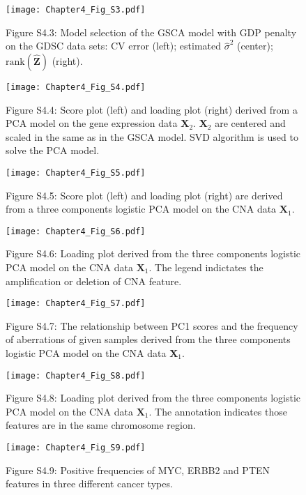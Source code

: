 \begin{figure}[htbp]\label{Fig:S6}
    \centering
    \texttt{[image: Chapter4\_Fig\_S3.pdf]}
    \caption*{Figure S4.3: Model selection of the GSCA model with GDP penalty on the GDSC data sets: CV error (left); estimated $\hat{\sigma}^2$ (center); $\text{rank}(\hat{\mathbf{Z}})$ (right).}
	\label{chapter4_fig:S3}
\end{figure}

\begin{figure}[htbp]
    \centering
    \texttt{[image: Chapter4\_Fig\_S4.pdf]}
    \caption*{Figure S4.4: Score plot (left) and loading plot (right) derived from a PCA model on the gene expression data $\mathbf{X}_2$. $\mathbf{X}_2$ are centered and scaled in the same as in the GSCA model. SVD algorithm is used to solve the PCA model.}
	\label{chapter4_fig:S4}
\end{figure}

\begin{figure}[htbp]
    \centering
    \texttt{[image: Chapter4\_Fig\_S5.pdf]}
    \caption*{Figure S4.5: Score plot (left) and loading plot (right) are derived from a three components logistic PCA model on the CNA data $\mathbf{X}_1$.}
	\label{chapter4_fig:S5}
\end{figure}

\begin{figure}[htbp]
    \centering
    \texttt{[image: Chapter4\_Fig\_S6.pdf]}
    \caption*{Figure S4.6: Loading plot derived from the three components logistic PCA model on the CNA data $\mathbf{X}_1$. The legend indictates the amplification or deletion of CNA feature.}
	\label{chapter4_fig:S6}
\end{figure}

\begin{figure}[htbp]
    \centering
    \texttt{[image: Chapter4\_Fig\_S7.pdf]}
    \caption*{Figure S4.7: The relationship between PC1 scores and the frequency of aberrations of given samples derived from the three components logistic PCA model on the CNA data $\mathbf{X}_1$. }
	\label{chapter4_fig:S7}
\end{figure}

\begin{figure}[htbp]
    \centering
    \texttt{[image: Chapter4\_Fig\_S8.pdf]}
    \caption*{Figure S4.8: Loading plot derived from the three components logistic PCA model on the CNA data $\mathbf{X}_1$. The annotation indicates those features are in the same chromosome region.}
	\label{chapter4_fig:S8}
\end{figure}

\begin{figure}[htbp]
    \centering
    \texttt{[image: Chapter4\_Fig\_S9.pdf]}
    \caption*{Figure S4.9: Positive frequencies of MYC, ERBB2 and PTEN features in three different cancer types.}
	\label{chapter4_fig:S9}
\end{figure} 